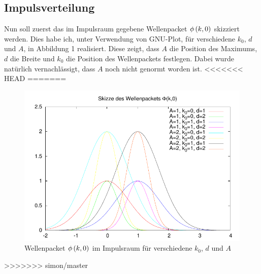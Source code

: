 \subsection{Impulsverteilung}
Nun soll zuerst das im Impulsraum gegebene Wellenpacket $\phi\del{k,0}$ skizziert werden. Dies habe ich, unter Verwendung von GNU-Plot, für verschiedene $k_0$, $d$ und $A$, in Abbildung 1 realisiert. Diese zeigt, dass $A$ die Position des Maximums, $d$ die Breite und $k_0$ die Position des Wellenpackets festlegen. Dabei wurde natürlich vernachlässigt, dass $A$ noch nicht genormt worden ist.
<<<<<<< HEAD
=======
\begin{figure}[ht]
	\centering
	\includegraphics[scale=1.3]{Skizze_zu_3_1.pdf}
	\caption{Wellenpacket $\phi\del{k,0}$ im Impulsraum für verschiedene $k_0$, $d$ und $A$}
\end{figure}
>>>>>>> simon/master

